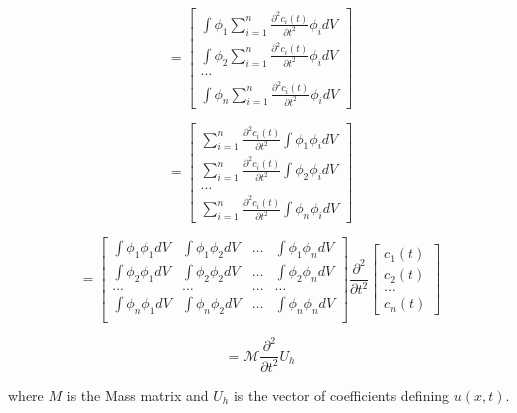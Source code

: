 \begin{equation}
= \begin{bmatrix}
\int \phi_1 \sum\limits_{i=1}^n \frac{\partial^2 c_i(t)}{\partial t^2} \phi_i dV \\
\int \phi_2 \sum\limits_{i=1}^n \frac{\partial^2 c_i(t)}{\partial t^2} \phi_i dV \\
\ldots \\
\int \phi_n \sum\limits_{i=1}^n \frac{\partial^2 c_i(t)}{\partial t^2} \phi_i dV
\end{bmatrix}
\end{equation}

\begin{equation}
= \begin{bmatrix}
\sum\limits_{i=1}^n \frac{\partial^2 c_i(t)}{\partial t^2} \int \phi_1 \phi_i dV \\
\sum\limits_{i=1}^n \frac{\partial^2 c_i(t)}{\partial t^2} \int \phi_2 \phi_i dV \\
\ldots \\
\sum\limits_{i=1}^n \frac{\partial^2 c_i(t)}{\partial t^2} \int \phi_n \phi_i dV
\end{bmatrix}
\end{equation}

\begin{equation}
\label{eq:Mass-Mat}
= \begin{bmatrix}
\int \phi_1 \phi_1 dV & \int \phi_1 \phi_2 dV & \ldots & \int \phi_1 \phi_n dV \\
\int \phi_2 \phi_1 dV & \int \phi_2 \phi_2 dV & \ldots & \int \phi_2 \phi_n dV \\
\ldots                & \ldots                & \ldots & \ldots \\
\int \phi_n \phi_1 dV & \int \phi_n \phi_2 dV & \ldots & \int \phi_n \phi_n dV \\
\end{bmatrix} 
\frac{\partial^2}{\partial t^2} 
\begin{bmatrix}
c_1(t) \\
c_2(t) \\
\ldots \\
c_n(t)
\end{bmatrix}
\end{equation}

\begin{equation}
\label{eq:Mass-Var}
= \mathcal{M} \frac{\partial^2}{\partial t^2} U_h
\end{equation}

where $M$ is the Mass matrix and $U_h$ is the vector of coefficients defining $u(x,t)$. 

